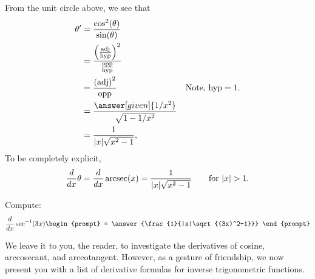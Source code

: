 \documentclass{ximera}
\begin{document}
\begin{theorem}
\begin{explanation}
\begin{image}
\end{image}
From the unit circle above, we see that 
\begin{align*}
  \theta' &= \frac{\cos^2(\theta)}{\sin(\theta)}\\
  &= \frac{
    \left(\frac{\mathrm{adj}}{\mathrm{hyp}}\right)^2}{\frac{\mathrm{opp}}{\mathrm{hyp}}}\\
  &= \frac{\left(\mathrm{adj}\right)^2}{\mathrm{opp}} &\text{Note, $\mathrm{hyp}=1$.}\\
  &= \frac{\answer[given]{1/x^2}}{\sqrt{1-1/x^2}}\\
  &= \frac{1}{|x|\sqrt{x^2-1}},
\end{align*}
To be completely explicit, 
\[
\ddx \theta = \ddx \arcsec(x) = \frac{1}{|x|\sqrt{x^2-1}}\qquad\text{for $|x|>1$}. 
\]
\end{explanation}
\end{theorem}

\begin{question}
  Compute:
  \[
  \ddx \sec^{-1}(3x)
  \begin{prompt}
    = \answer{\frac{1}{|x|\sqrt{(3x)^2-1}}}
  \end{prompt}
  \]
\end{question}

We leave it to you, the reader, to investigate the derivatives of
cosine, arccosecant, and arccotangent. However, as a gesture of
friendship, we now present you with a list of derivative formulas for
inverse trigonometric functions.
\end{document}

